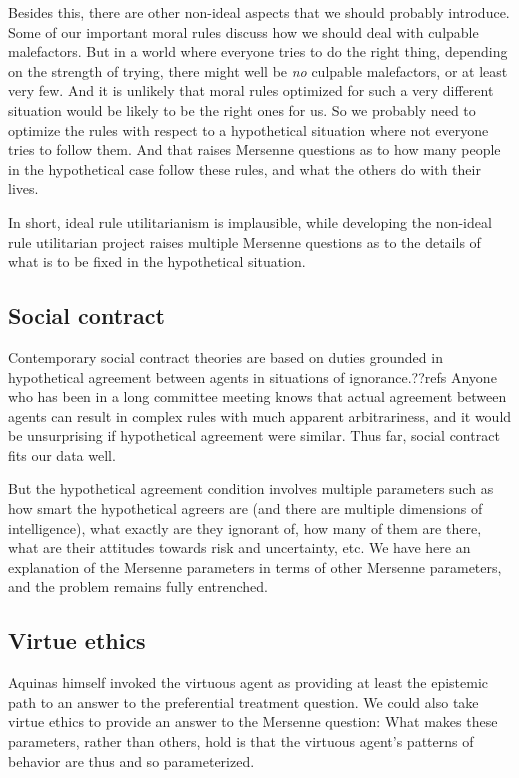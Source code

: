 Besides this, there are other non-ideal aspects that we should probably introduce. Some of our important moral rules discuss how
we should deal with culpable malefactors. But in a world where everyone tries to do the right thing, depending on the strength
of trying, there might well be \textit{no} culpable malefactors, or at least very few. And it is unlikely that moral rules optimized
for such a very different situation would be likely to be the right ones for us. So we probably need to optimize the rules with
respect to a hypothetical situation where not everyone tries to follow them. And that raises Mersenne questions as to how many
people in the hypothetical case follow these rules, and what the others do with their lives. 

In short, ideal rule utilitarianism is implausible, while developing the non-ideal rule utilitarian project raises multiple
Mersenne questions as to the details of what is to be fixed in the hypothetical situation.

\subsection{Social contract}
Contemporary social contract theories are based on duties grounded in hypothetical agreement between agents in situations of 
ignorance.??refs Anyone who has been in a long committee meeting knows that actual agreement between agents can result in 
complex rules with much apparent arbitrariness, and it would be unsurprising if hypothetical agreement were similar. Thus far, 
social contract fits our data well. 

But the hypothetical agreement condition involves multiple parameters such as how smart the hypothetical agreers are (and there are
multiple dimensions of intelligence), what exactly are they ignorant of, how many of them are there, what are their attitudes towards
risk and uncertainty, etc. We have here an explanation of the Mersenne parameters in terms of other Mersenne parameters, and the
problem remains fully entrenched. 

\subsection{Virtue ethics}
Aquinas himself invoked the virtuous agent as providing at least the epistemic path to an answer to the preferential treatment
question. We could also take virtue ethics to provide an answer to the Mersenne question: What makes these parameters, rather
than others, hold is that the virtuous agent's patterns of behavior are thus and so parameterized.

